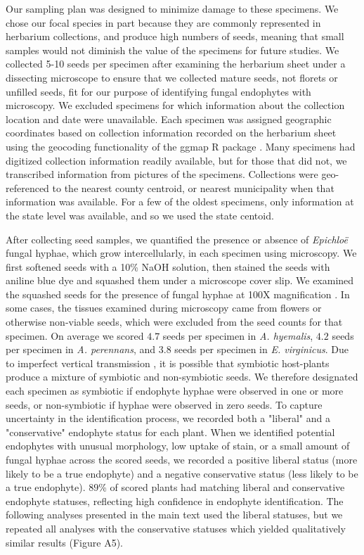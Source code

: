 \documentclass[11pt]{article}
\let\cite\citep
\begin{document}
Our sampling plan was designed to minimize damage to these specimens.
We chose our focal species in part because they are commonly represented in herbarium collections, and produce high numbers of seeds, meaning that small samples would not diminish the value of the specimens for future studies. 
We collected 5-10 seeds per specimen after examining the herbarium sheet under a dissecting microscope to ensure that we collected mature seeds, not florets or unfilled seeds, fit for our purpose of identifying fungal endophytes with microscopy.
We excluded specimens for which information about the collection location and date were unavailable.
Each specimen was assigned geographic coordinates based on collection information recorded on the herbarium sheet using the geocoding functionality of the ggmap R package \citep{kahle2019package}.
Many specimens had digitized collection information readily available, but for those that did not, we transcribed information from pictures of the specimens. 
Collections were geo-referenced to the nearest county centroid, or nearest municipality when that information was available. 
For a few of the oldest specimens, only information at the state level was available, and so we used the state centoid.


After collecting seed samples, we quantified the presence or absence of \emph{Epichloë} fungal hyphae, which grow intercellularly, in each specimen using microscopy. 
We first softened seeds with a 10\% NaOH solution, then stained the seeds with aniline blue dye and squashed them under a microscope cover slip. 
We examined the squashed seeds for the presence of fungal hyphae at 100X magnification \cite{bacon2018stains}.
In some cases, the tissues examined during microscopy came from flowers or otherwise non-viable seeds, which were excluded from the seed counts for that specimen.
On average we scored $4.7$ seeds per specimen in \emph{A. hyemalis}, $4.2$ seeds per specimen in \emph{A. perennans}, and $3.8$ seeds per specimen in \emph{E. virginicus}.
Due to imperfect vertical transmission \cite{afkhami2008symbiosis}, it is possible that symbiotic host-plants produce a mixture of symbiotic and non-symbiotic seeds. 
We therefore designated each specimen as symbiotic if endophyte hyphae were observed in one or more seeds, or non-symbiotic if hyphae were observed in zero seeds. 
To capture uncertainty in the identification process, we recorded both a "liberal" and a "conservative" endophyte status for each plant.  
When we identified potential endophytes with unusual morphology, low uptake of stain, or a small amount of fungal hyphae across the scored seeds, we recorded a positive liberal status (more likely to be a true endophyte) and a negative conservative status (less likely to be a true endophyte). 
$89$\% of scored plants had matching liberal and conservative endophyte statuses, reflecting high confidence in endophyte identification.
The following analyses presented in the main text used the liberal statuses, but we repeated all analyses with the conservative statuses which yielded qualitatively similar results (Figure A5). 
\end{document}
